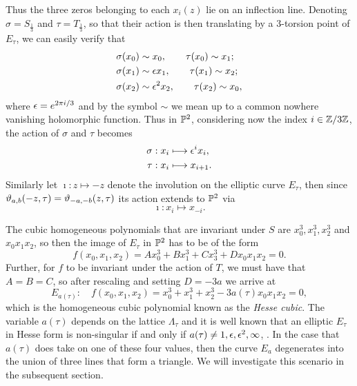 Thus the three zeros belonging to each $x_{i}(z)$ lie on an inflection line.
Denoting $\sigma = S_{\tfrac{1}{3}}$ and $\tau = T_{\frac{1}{3}}$, so that their action is then translating by a 3-torsion point of $E_{\tau}$, we can easily verify that
\begin{equation}
	\label{hesse_transformation}
	\begin{split}
	\sigma(x_{0}) &\sim x_{0},\qquad \tau(x_{0}) \sim x_{1};\\
	\sigma(x_{1}) &\sim \epsilon x_{1},\qquad \tau(x_{1}) \sim x_{2};\\
	\sigma(x_{2}) &\sim \epsilon^{2} x_{2},\qquad \tau(x_{2}) \sim x_{0},
	\end{split}
\end{equation}
where $\epsilon = e^{2\pi i /3}$ and by the symbol $\sim$ we mean up to a common nowhere vanishing holomorphic function. Thus in $\mathbb{P}^{2}$, considering now the index $i \in \mathbb{Z}/3\mathbb{Z}$, the action of $\sigma$ and $\tau$ becomes
\begin{equation}
\label{hesse_heisenberg}
	\begin{split}
	\sigma: x_{i} &\longmapsto \epsilon^{i} x_{i},\\
	\tau: x_{i} &\longmapsto x_{i+1}.
	\end{split}
\end{equation}
Similarly let $\imath:z \mapsto -z$ denote the involution on the elliptic curve $E_{\tau}$, then since $\vartheta_{a,b}(-z,\tau) = \vartheta_{-a,-b}(z,\tau)$ its action extends to $\mathbb{P}^{2}$ via
\begin{equation}
	\label{hesse_involution}
	\imath: x_{i} \longmapsto x_{-i}.
\end{equation}

The cubic homogeneous polynomials that are invariant under $S$ are $x_{0}^{3}, x_{1}^{3}, x_{2}^{3}$ and $x_{0}x_{1}x_{2}$, so then the image of $E_{\tau}$ in $\mathbb{P}^{2}$ has to be of the form \cite{Tracy_1985}
\begin{equation*}
	f(x_{0},x_{1}, x_{2}) = Ax_{0}^{3} + Bx_{1}^{3} + C x_{3}^{3} + Dx_{0}x_{1}x_{2} = 0.
\end{equation*}
Further, for $f$ to be invariant under the action of $T$, we must have that $A = B = C$, so after rescaling and setting $D = -3a$ we arrive at
\begin{equation}
	\label{hesse_pencil}
	E_{a(\tau)}:\quad f(x_{0}, x_{1}, x_{2}) = x_{0}^{3} + x_{1}^{3} + x_{2}^{3} -3a(\tau) x_{0}x_{1}x_{2} = 0,
\end{equation}
which is the homogeneous cubic polynomial known as the \emph{Hesse cubic}. The variable $a(\tau)$ depends on the lattice $\Lambda_{\tau}$ and it is well known that an elliptic $E_{\tau}$ in Hesse form is non-singular if and only if $a(\tau) \neq 1, \epsilon, \epsilon^{2}, \infty$, \cite{Dolgachev_2006}. In the case that $a(\tau)$ does take on one of these four values, then the curve $E_{a}$ degenerates into the union of three lines that form a triangle. We will investigate this scenario in the subsequent section.\\

